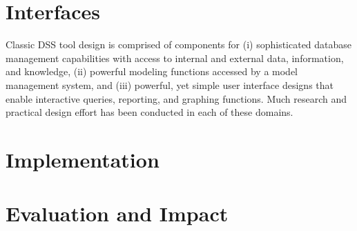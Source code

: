 \section{Interfaces}
\label{sec:Interfaces}
\indent Classic DSS tool design is comprised of components for (i) sophisticated database management capabilities with access to internal and external data, information, and knowledge, (ii) powerful modeling functions accessed by a model management system, and (iii) powerful, yet simple user interface designs that enable interactive queries, reporting, and graphing functions. Much research and practical design effort has been conducted in each of these domains.\\

\section{Implementation}
\label{sec:Implementation}

\section{Evaluation and Impact}
\label{sec:EvaluationAndImpact}